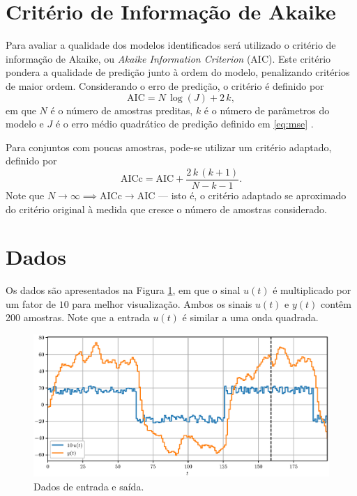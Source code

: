 \documentclass{ppgeesa}
\newcommand{\Prod}{\,}
\begin{document}
\section{Critério de Informação de Akaike}

Para avaliar a qualidade dos modelos identificados será utilizado o critério de informação de Akaike, ou \emph{Akaike Information Criterion} (AIC).
Este critério pondera a qualidade de predição junto à ordem do modelo, penalizando critérios de maior ordem.
Considerando o erro de predição, o critério é definido por
\begin{equation}
  \text{AIC} = N \Prod \log\left(J\right) + 2 \Prod k
  ,
\end{equation}
em que $N$ é o número de amostras preditas, $k$ é o número de parâmetros do modelo e $J$ é o erro médio quadrático de predição definido em \eqref{eq:mse} \cite{book:Soderstrom1989}.

Para conjuntos com poucas amostras, pode-se utilizar um critério adaptado, definido por
\begin{equation}\label{eq:akaike-small}
  \text{AICc} = \text{AIC} + \dfrac{2 \Prod k \Prod \left(k + 1\right)}{N - k - 1}
  .
\end{equation}
Note que $N \to \infty \implies \text{AICc} \to \text{AIC}$ --- isto é, o critério adaptado se aproximado do critério original à medida que cresce o número de amostras considerado.

\section{Dados}

Os dados são apresentados na Figura \ref{fig:data}, em que o sinal $u(t)$ é multiplicado por um fator de $10$ para melhor visualização.
Ambos os sinais $u(t)$ e $y(t)$ contêm 200 amostras.
Note que a entrada $u(t)$ é similar a uma onda quadrada.
\begin{figure}[!htbp]
  \centering
  \includegraphics[width=\linewidth]{data_folded}
  \caption{Dados de entrada e saída.}
  \label{fig:data}
\end{figure}
\end{document}
